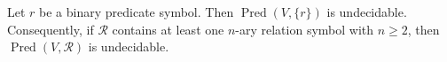 Let $r$ be a binary predicate symbol. Then $\operatorname{Pred}(V, \{r\})$ is undecidable. Consequently, if $\mathcal{R}$ contains at least one $n$-ary relation symbol with $n \geqslant 2$, then $\operatorname{Pred}(V, \mathcal{R})$ is undecidable.

